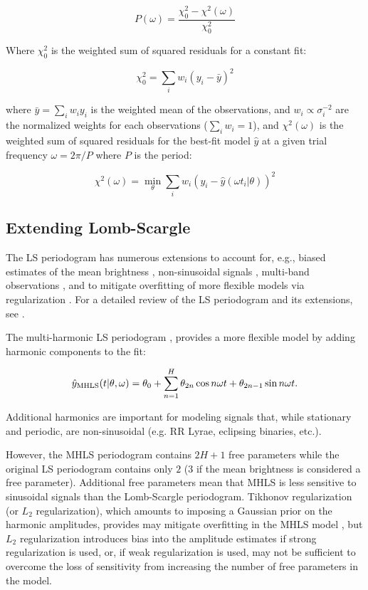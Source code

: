 \documentclass[apj]{emulateapj}
\begin{document}
\begin{equation}
P(\omega) = \frac{\chi^2_0 - \chi^2(\omega)}{\chi^2_0}
\end{equation}

Where $\chi^2_0$ is the weighted sum of squared residuals for a constant fit:

\begin{equation}
\chi^2_0 = \sum_i w_i (y_i - \bar{y})^2
\end{equation}

where $\bar{y} = \sum_i w_i y_i$ is the weighted mean of the observations, and 
$w_i \propto \sigma_i^{-2}$ are the normalized weights for each observations ($\sum_i w_i = 1$),
and $\chi^2(\omega)$ is the weighted sum of squared residuals for the best-fit model $\hat{y}$ at
a given trial frequency $\omega = 2\pi / P$ where $P$ is the period:

\begin{equation}
\chi^2(\omega) = \min_{\theta} \sum_i w_i (y_i - \hat{y}(\omega t_i | \theta))^2
\end{equation}


\subsection{Extending Lomb-Scargle}

The LS periodogram has numerous extensions to account for, e.g., biased estimates of the mean brightness
\citep{Zechmeister+Kurster_2009}, non-sinusoidal signals \citep{Schwarzenberg-Czerny_1996,Palmer_2009},
multi-band observations \citep{Vanderplas+Ivezic_2015}, and to mitigate overfitting of more
flexible models via regularization \citep{Vanderplas+Ivezic_2015}. For a detailed review
of the LS periodogram and its extensions, see \cite{Vanderplas_2017}.

The multi-harmonic LS periodogram \citep[MHLS;]{Bretthorst_1988,Schwarzenberg-Czerny_1996,Palmer_2009}, provides a more
flexible model by adding harmonic components to the fit:

\begin{equation}
    \hat{y}_{\rm MHLS}(t|\theta, \omega) = \theta_0 + \sum_{n=1}^H \theta_{2n}\cos{n\omega t} + \theta_{2n-1}\sin{n\omega t}.
\end{equation}

Additional harmonics are important for modeling signals that, while stationary and periodic,
are non-sinusoidal (e.g. RR Lyrae, eclipsing binaries, etc.).

However, the MHLS periodogram contains $2H+1$ free parameters while the original LS periodogram
contains only $2$ ($3$ if the mean brightness is considered a free parameter). Additional free parameters
mean that MHLS is less sensitive to sinusoidal signals than the Lomb-Scargle periodogram.
Tikhonov regularization (or $L_2$ regularization), which amounts to imposing a Gaussian prior on the harmonic amplitudes,
provides may mitigate overfitting in the MHLS model \citep{Vanderplas+Ivezic_2015},
but $L_2$ regularization introduces bias into the amplitude estimates if strong regularization is used, or, if
weak regularization is used, may not be sufficient to overcome the loss of sensitivity from
increasing the number of free parameters in the model.
\end{document}
